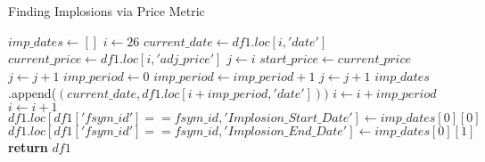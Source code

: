 \documentclass[a4paper]{report}
\begin{document}
\begin{algorithm}
  \caption{Finding Implosions via Price Metric}
  \label{alg:find_implosions}
  \begin{algorithmic}[1]
    \State $imp\_dates \gets []$
    \State $i \gets 26$
        \State $current\_date \gets df1.loc[i, 'date']$
        \State $current\_price \gets df1.loc[i, 'adj\_price']$
            \State $j \gets i$
            \State $start\_price \gets current\_price$
            \State $j \gets j + 1$
            \State $imp\_period \gets 0$
                \State $imp\_period \gets imp\_period + 1$
                \State $j \gets j + 1$
            \EndWhile
                \State $imp\_dates$.append($(current\_date, df1.loc[i + imp\_period, 'date']))$
            \EndIf
            \State $i \gets i + imp\_period$
        \EndIf
        \State $i \gets i + 1$
    \EndWhile
        \State $df1.loc[df1['fsym\_id'] == fsym\_id, 'Implosion\_Start\_Date'] \gets imp\_dates[0][0]$
        \State $df1.loc[df1['fsym\_id'] == fsym\_id, 'Implosion\_End\_Date'] \gets imp\_dates[0][1]$
    \EndIf
    \State \textbf{return} $df1$
\EndProcedure
  \end{algorithmic}
  \end{algorithm}
\end{document}
